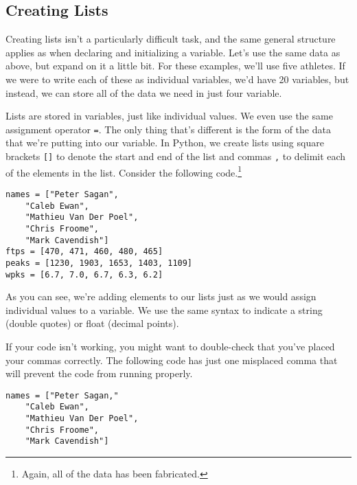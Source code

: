 \subsection{Creating Lists}
Creating lists isn't a particularly difficult task, and the same general structure applies as when declaring and initializing a variable. Let's use the same data as above, but expand on it a little bit. For these examples, we'll use five athletes. If we were to write each of these as individual variables, we'd have 20 variables, but instead, we can store all of the data we need in just four variable.\par
Lists are stored in variables, just like individual values. We even use the same assignment operator \verb|=|. The only thing that's different is the form of the data that we're putting into our variable. In Python, we create lists using square brackets \verb|[]| to denote the start and end of the list and commas \verb|,| to delimit each of the elements in the list. Consider the following code.\footnote{Again, all of the data has been fabricated.}\par
\begin{lstlisting}[style=pippython]
names = ["Peter Sagan",
    "Caleb Ewan",
    "Mathieu Van Der Poel",
    "Chris Froome",
    "Mark Cavendish"]
ftps = [470, 471, 460, 480, 465]
peaks = [1230, 1903, 1653, 1403, 1109]
wpks = [6.7, 7.0, 6.7, 6.3, 6.2]
\end{lstlisting}
As you can see, we're adding elements to our lists just as we would assign individual values to a variable. We use the same syntax to indicate a string (double quotes) or float (decimal points).\par
{}
If your code isn't working, you might want to double-check that you've placed your commas correctly. The following code has just one misplaced comma that will prevent the code from running properly.\par
\begin{lstlisting}[style=pippython]
names = ["Peter Sagan,"
    "Caleb Ewan",
    "Mathieu Van Der Poel",
    "Chris Froome",
    "Mark Cavendish"]
\end{lstlisting}
